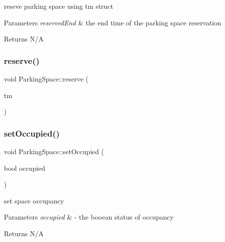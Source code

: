 reseve parking space using tm struct 


\begin{DoxyParams}{Parameters}
{\em reserved\+End} & the end time of the parking space reservation \\
\hline
\end{DoxyParams}
\begin{DoxyReturn}{Returns}
N/A 
\end{DoxyReturn}
\mbox{\label{class_parking_space_a22e2c189a28f4b56cb73ba807811e6ad}} 
\subsubsection{\texorpdfstring{reserve()}{reserve()}\hspace{0.1cm}{\footnotesize\ttfamily [2/2]}}
{\footnotesize\ttfamily void Parking\+Space\+::reserve (\begin{DoxyParamCaption}\item[{tm}]{ }\end{DoxyParamCaption})}

\mbox{\label{class_parking_space_ab535bca076add6abc31048ea8aff5719}} 
\subsubsection{\texorpdfstring{set\+Occupied()}{setOccupied()}\hspace{0.1cm}{\footnotesize\ttfamily [1/2]}}
{\footnotesize\ttfamily void Parking\+Space\+::set\+Occupied (\begin{DoxyParamCaption}\item[{bool}]{occupied }\end{DoxyParamCaption})}



set space occupancy 


\begin{DoxyParams}{Parameters}
{\em occupied} & -\/ the booean status of occupancy \\
\hline
\end{DoxyParams}
\begin{DoxyReturn}{Returns}
N/A 
\end{DoxyReturn}
\mbox{\label{class_parking_space_ab535bca076add6abc31048ea8aff5719}} 
